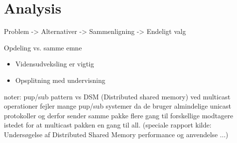 \chapter{Analysis}
Problem -> Alternativer -> Sammenligning -> Endeligt valg


Opdeling vs. samme emne
\begin{itemize}
\item Vidensudveksling er vigtig
\item  Opsplitning med undervisning
\end{itemize}


noter:
pup/sub pattern vs DSM (Distributed shared memory)
ved multicast operationer fejler mange pup/sub systemer da de bruger almindelige unicast protokoller og derfor sender samme pakke flere gang til forskellige modtagere istedet for at multicast pakken en gang til all. (speciale rapport kilde: Unders\o gelse af Distributed Shared Memory performance og anvendelse ...)






